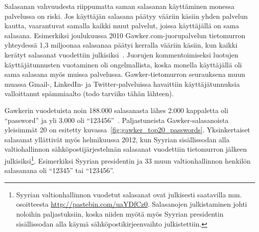 \documentclass[finnish,gradu]{tktltiki}
\begin{document}
  Salasanan vahvuudesta riippumatta saman salasanan käyttäminen monessa palvelussa on riski. Jos käyttäjän salasana päätyy vääriin käsiin yhden palvelun kautta, vaarantuvat samalla kaikki muut palvelut, joissa käyttäjällä on sama salasana. Esimerkiksi joulukuussa 2010 Gawker.com-juorupalvelun tietomurron yhteydessä 1,3 miljoonaa salasanaa päätyi kerralla vääriin käsiin, kun kaikki kerätyt salasanat vuodettiin julkisiksi~\cite{bbc_gawker_12_2010, forbes_gawker_12_2010}. Juorujen kommentoimiseksi luotujen käyttäjätunnusten vuotaminen oli ongelmallista, koska monella käyttäjällä oli sama salasana myös muissa palvelussa. Gawker-tietomurron seurauksena muun muassa Gmail-, LinkedIn- ja Twitter-palveluissa havaittiin käyttäjätunnuksia valloittanut spämmiaalto (todo tarviiko tähän lähteen).

   Gawkerin vuodetuista noin 188.000 salasanasta lähes 2.000 kappaletta oli ``password'' ja yli 3.000 oli  ``123456''~\cite{forbes_gawker_12_2010}. Paljastuneista Gawker-salasanoista yleisimmät 20 on esitetty kuvassa~\ref{fig:gawker_top20_passwords}. Yksinkertaiset salasanat yllättivät myös helmikuussa 2012, kun Syyrian sisällissodan alla valtiohallinnon sähköpostijärjestelmän salasanat vuodettiin tietomurron jälkeen julkisiksi\footnote{Syyrian valtionhallinnon vuodetut salasanat ovat julkisesti saatavilla mm. osoitteesta \url{http://pastebin.com/uaYDfCz0}. Salasanojen julkistaminen johti noloihin paljastuksiin, koska niiden myötä myös Syyrian presidentin sisällissodan alla käymä sähköpostikirjeenvaihto julkistettiin.}. Esimerkiksi Syyrian presidentin ja 33 muun valtionhallinnon henkilön salasanana oli ``12345'' tai ``123456''.
\end{document}
